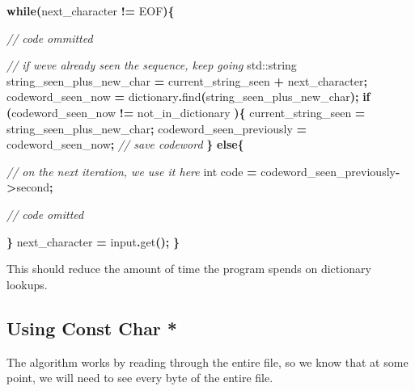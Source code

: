 \documentclass[12pt,twoside]{reedthesis}
\newenvironment{Shaded}{\begin{snugshade}}{\end{snugshade}}
\newcommand{\BuiltInTok}[1]{#1}
\newcommand{\CommentTok}[1]{\textcolor[rgb]{0.56,0.35,0.01}{\textit{#1}}}
\newcommand{\ControlFlowTok}[1]{\textcolor[rgb]{0.13,0.29,0.53}{\textbf{#1}}}
\newcommand{\DataTypeTok}[1]{\textcolor[rgb]{0.13,0.29,0.53}{#1}}
\newcommand{\NormalTok}[1]{#1}
\newcommand{\OperatorTok}[1]{\textcolor[rgb]{0.81,0.36,0.00}{\textbf{#1}}}
\begin{document}
\begin{Shaded}
\begin{Highlighting}[]

\ControlFlowTok{while}\OperatorTok{(}\NormalTok{next\_character }\OperatorTok{!=}\NormalTok{ EOF}\OperatorTok{)\{}

    \CommentTok{// code ommitted}

    \CommentTok{// if we\textquotesingle{}ve already seen the sequence, keep going}
    \BuiltInTok{std::}\NormalTok{string}\OperatorTok{ }\NormalTok{string\_seen\_plus\_new\_char }\OperatorTok{=}\NormalTok{ current\_string\_seen }
                                                \OperatorTok{+}\NormalTok{ next\_character}\OperatorTok{;}
\NormalTok{    codeword\_seen\_now }\OperatorTok{=}\NormalTok{ dictionary}\OperatorTok{.}\NormalTok{find}\OperatorTok{(}\NormalTok{string\_seen\_plus\_new\_char}\OperatorTok{);}
    \ControlFlowTok{if} \OperatorTok{(}\NormalTok{codeword\_seen\_now }\OperatorTok{!=}\NormalTok{ not\_in\_dictionary }\OperatorTok{)\{}
\NormalTok{        current\_string\_seen }\OperatorTok{=}\NormalTok{ string\_seen\_plus\_new\_char}\OperatorTok{;}
\NormalTok{        codeword\_seen\_previously }\OperatorTok{=}\NormalTok{ codeword\_seen\_now}\OperatorTok{;} \CommentTok{// save codeword }
    \OperatorTok{\}}
    \ControlFlowTok{else}\OperatorTok{\{}

        \CommentTok{// on the next iteration, we use it here}
        \DataTypeTok{int}\NormalTok{ code }\OperatorTok{=}\NormalTok{ codeword\_seen\_previously}\OperatorTok{{-}\textgreater{}}\NormalTok{second}\OperatorTok{;}

        \CommentTok{// code omitted}

    \OperatorTok{\}}
\NormalTok{    next\_character }\OperatorTok{=}\NormalTok{ input}\OperatorTok{.}\NormalTok{get}\OperatorTok{();}
\OperatorTok{\}}
\end{Highlighting}
\end{Shaded}
This should reduce the amount of time the program spends on dictionary lookups.

\hypertarget{using-const-char}{%
\subsection{Using Const Char *}\label{using-const-char}}

The algorithm works by reading through the entire file, so we know that at some point, we will need to see every byte of the entire file.
\end{document}

